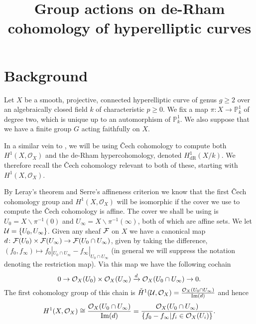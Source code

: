 \documentclass[draft, 11pt]{article} %
\title{Group actions on de-Rham cohomology of hyperelliptic curves}
\author{}
\theoremstyle{plain}
\theoremstyle{remark}
\newcommand{\cO}{{\cal O}}
\newcommand{\cech}{\v{C}ech }
\newcommand{\hone}{H^1(X,\mathcal{O}_X)}
\newcommand{\cechhone}{\check{H}^1(\mathcal U,\mathcal O_X)}
\newcommand{\derhamhone}{H_{\text {dR}}^1(X/k)}
\DeclareMathOperator{\Ima}{Im}
\begin{document}
\maketitle

\listoftodos

\section{Background}


Let $X$ be a smooth, projective, connected hyperelliptic curve of genus $g \geq 2$ over an algebraically closed field $k$ of characteristic $p \geq 0$.
We  fix a map $\pi \colon X \rightarrow \mathbb P_k^1$ of degree two, which is unique up to an automorphism of $\mathbb P_k^1$.
We also suppose that we have a finite group $G$ acting faithfully on $X$.

In a similar vein to \cite{canonicalrepresentation}, we will be using \cech cohomology to compute both $\hone$ and the de-Rham hypercohomology, denoted $\derhamhone$.
We therefore recall the \cech cohomology relevant to both of these, starting with $\hone$.

By Leray's theorem \cite[Thm 5.2.12]{liu} and Serre's affineness criterion \cite[Thm 5.2.23]{liu} we know that the first \cech cohomology group and $\hone$ will be isomorphic if the cover we use to compute the \cech cohomology is affine.
The cover we shall be using is $U_0 = X\backslash \pi^{-1}(0)$ and $U_\infty = X\backslash  \pi^{-1}(\infty) $, both of which are affine sets.
We let ${\cal U} = \{ U_0, U_\infty\}$.
Given any sheaf $\cal F$ on $X$ we have a canonical map $d\colon {\cal F}(U_0) \times {\cal F} (U_\infty) \rightarrow {\cal F}(U_0 \cap U_\infty)$, given by taking the difference, $(f_0,f_\infty) \mapsto f_0|_{U_0 \cap U_\infty} - f_\infty|_{U_0 \cap U_\infty}$ (in general we will suppress the notation denoting the restriction map). 
Via this map we have the following cochain
\begin{equation*}
0 \rightarrow \cO_X(U_0)\times \cO_X(U_\infty) \xrightarrow{d} \cO_X(U_0 \cap U_\infty) \rightarrow 0.
\end{equation*}
The first cohomology group of this chain is $\cechhone = \frac{\cO_X(U_0 \cap U_\infty)}{\Ima(d)}$ and hence
\begin{equation}\label{cechhone}
\hone \cong \frac{\cO_X(U_0 \cap U_\infty)}{\Ima(d)}  
 = \frac{\cO_X(U_0 \cap U_\infty)}{\{f_0 - f_\infty | f_i \in \cO_X(U_i) \}}.
\end{equation}
\end{document}
